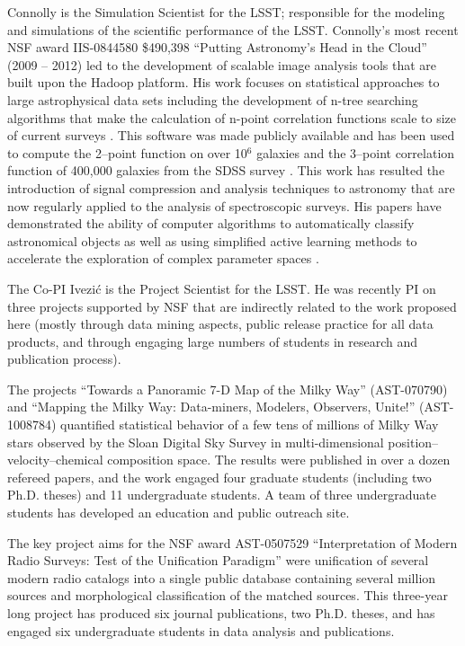 Connolly is the Simulation Scientist for the LSST; responsible for the
modeling and simulations of the scientific performance of the
LSST. Connolly's most recent NSF award IIS-0844580 \$490,398 ``Putting
Astronomy's Head in the Cloud'' (2009 -- 2012) led to the development
of scalable image analysis tools that are built upon the Hadoop
platform\citep{wiley2011}. His work focuses on statistical approaches
to large astrophysical data sets including the development of n-tree
searching algorithms that make the calculation of n-point correlation
functions scale to size of current surveys \cite{Moore00}. This
software was made publicly available and has been used to compute the
2--point function on over 10$^6$ galaxies and the 3--point correlation
function of 400,000 galaxies from the SDSS survey
\cite{Scranton2002,Szapudi2002,Nichol2006,mcbride2011a,mcbride2011b}. This
work has resulted the introduction of signal compression and analysis
techniques to astronomy that are now regularly applied to the analysis
of spectroscopic surveys. His papers have demonstrated the ability of
computer algorithms to automatically classify astronomical objects
\cite{vdp2009,daniel2011} as well as using simplified active learning
methods to accelerate the exploration of complex parameter spaces
\cite{daniel2012}.

The Co-PI Ivezi\'{c} is the Project Scientist for the LSST. He was
recently PI on three projects supported by NSF that are indirectly
related to the work proposed here (mostly through data mining aspects,
public release practice for all data products, and through engaging
large numbers of students in research and publication process).

The projects ``Towards a Panoramic 7-D Map of the Milky Way''
(AST-070790) and ``Mapping the Milky Way: Data-miners, Modelers,
Observers, Unite!'' (AST-1008784) quantified statistical behavior of a
few tens of millions of Milky Way stars observed by the Sloan Digital
Sky Survey in multi-dimensional position--velocity--chemical
composition space. The results were published in over a dozen refereed
papers, and the work engaged four graduate students (including two
Ph.D. theses) and 11 undergraduate students.  A team of three
undergraduate students has developed an education and public outreach
site.

The key project aims for the NSF award AST-0507529 ``Interpretation of
Modern Radio Surveys: Test of the Unification Paradigm'' were
unification of several modern radio catalogs into a single public
database containing several million sources and morphological
classification of the matched sources. This three-year long project
has produced six journal publications, two Ph.D. theses, and has
engaged six undergraduate students in data analysis and publications.


